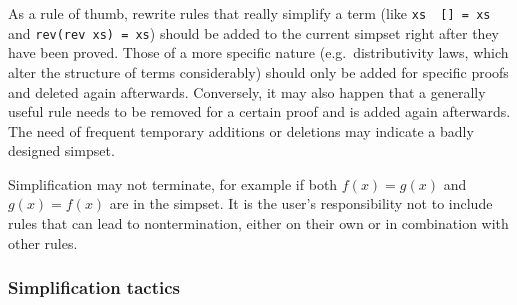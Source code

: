 As a rule of thumb, rewrite rules that really simplify a term (like
\texttt{xs \at\ [] = xs} and \texttt{rev(rev xs) = xs}) should be added to the
current simpset right after they have been proved.  Those of a more specific
nature (e.g.\ distributivity laws, which alter the structure of terms
considerably) should only be added for specific proofs and deleted again
afterwards.  Conversely, it may also happen that a generally useful rule
needs to be removed for a certain proof and is added again afterwards.  The
need of frequent temporary additions or deletions may indicate a badly
designed simpset.
\begin{warn}
  Simplification may not terminate, for example if both $f(x) = g(x)$ and
  $g(x) = f(x)$ are in the simpset. It is the user's responsibility not to
  include rules that can lead to nontermination, either on their own or in
  combination with other rules.
\end{warn}

\subsubsection{Simplification tactics}

